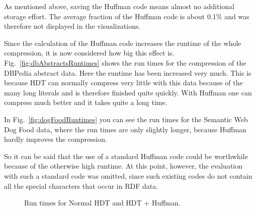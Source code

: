 As mentioned above, saving the Huffman code means almost no additional storage effort. The average fraction of the Huffman code is about 0.1\% and was therefore not displayed in the visualizations.

Since the calculation of the Huffman code increases the runtime of the whole compression, it is now considered how big this effect is. Fig.~\ref{fig:dbAbstractsRuntimes} shows the run times for the compression of the DBPedia abstract data. Here the runtime has been increased very much. This is because HDT can normally compress very little with this data because of the many long literals and is therefore finished quite quickly. With Huffman one can compress much better and it takes quite a long time.

In Fig.~\ref{fig:dogFoodRuntimes} you can see the run times for the Semantic Web Dog Food data, where the run times are only slightly longer, because Huffman hardly improves the compression.

So it can be said that the use of a standard Huffman code could be worthwhile because of the otherwise high runtime. At this point, however, the evaluation with such a standard code was omitted, since such existing codes do not contain all the special characters that occur in RDF data.


\begin{figure}[h]
	\centering
	\hfill
	\caption{Run times for Normal HDT and HDT + Huffman.}
	\label{fig:huffmanRuntimes}
\end{figure}

